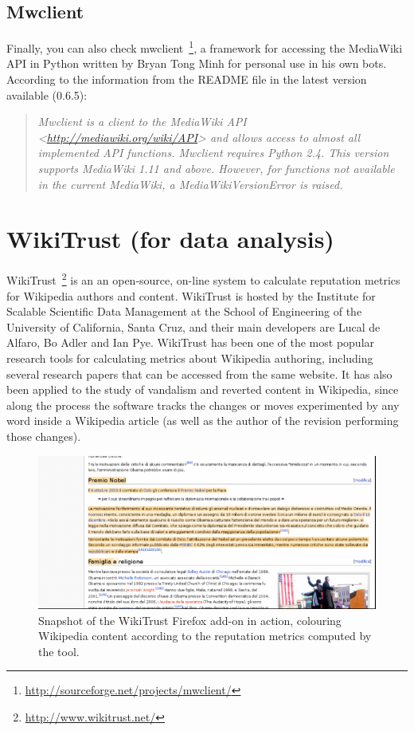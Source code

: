 \subsection{Mwclient}
Finally, you can also check mwclient~\footnote{\url{http://sourceforge.net/projects/mwclient/}}, 
a framework for accessing
the MediaWiki API in Python written by Bryan Tong Minh for personal use in his own
bots. According to the information from the README file in the latest version
available (0.6.5):

\begin{quotation}
 \textit{Mwclient is a client to the MediaWiki API <\url{http://mediawiki.org/wiki/API}>
and allows access to almost all implemented API functions. Mwclient requires
Python 2.4. This version supports MediaWiki 1.11 and above. However, for 
functions not available in the current MediaWiki, a MediaWikiVersionError
is raised.}
\end{quotation}

\section{WikiTrust (for data analysis)}
WikiTrust~\footnote{\url{http://www.wikitrust.net/}} is an an open-source, 
on-line system to calculate reputation metrics for Wikipedia authors and content.
WikiTrust is hosted by the Institute for Scalable Scientific Data Management at 
the School of Engineering of the University of California, Santa Cruz, and their
main developers are Lucal de Alfaro, Bo Adler and Ian Pye. WikiTrust has been
one of the most popular research tools for calculating metrics about Wikipedia
authoring, including several research papers that can be accessed from the same
website. It has also been applied to the study of vandalism and reverted content
in Wikipedia, since along the process the software tracks the changes or moves
experimented by any word inside a Wikipedia article (as well as the author of
the revision performing those changes).

\begin{figure}[h]
  \centering
    \includegraphics[width=\textwidth]{figs/wikitrust}
  \caption{Snapshot of the WikiTrust Firefox add-on in action, colouring Wikipedia
content according to the reputation metrics computed by the tool.}
\end{figure}


